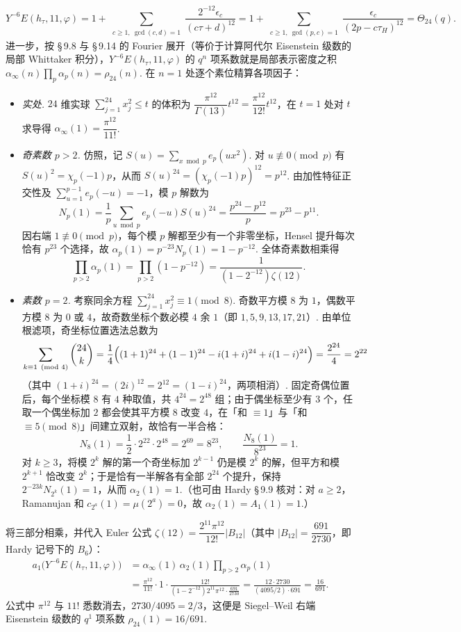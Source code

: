 \[
Y^{-6}E(h_\tau,11,\varphi)
=1+\sum_{\substack{c\ge 1,\ \gcd(c,d)=1}}\frac{2^{-12}\epsilon_c}{(c\tau+d)^{12}}
=1+\sum_{\substack{c\ge 1,\ \gcd(p,c)=1}}\frac{\epsilon_c}{(2p-c\tau_H)^{12}}
=\Theta_{24}(q).
\]
进一步，按 \S\,9.8 与 \S\,9.14 的 Fourier 展开（等价于计算阿代尔 Eisenstein 级数的局部 Whittaker 积分），$Y^{-6}E(h_\tau,11,\varphi)$ 的 $q^n$ 项系数就是局部表示密度之积 $\alpha_\infty(n)\prod_p\alpha_p(n)=\rho_{24}(n)$. 在 $n=1$ 处逐个素位精算各项因子：
\begin{itemize}
\item \emph{实处.} $24$ 维实球 $\sum_{j=1}^{24}x_j^2\le t$ 的体积为 $\dfrac{\pi^{12}}{\Gamma(13)}t^{12}=\dfrac{\pi^{12}}{12!}t^{12}$，在 $t=1$ 处对 $t$ 求导得 $\alpha_\infty(1)=\dfrac{\pi^{12}}{11!}$.
\item \emph{奇素数 $p>2$.} 仿照，记 $S(u)=\sum_{x\bmod p}e_p(ux^2)$. 对 $u\not\equiv 0\pmod p$ 有 $S(u)^2=\chi_p(-1)p$，从而 $S(u)^{24}=(\chi_p(-1)p)^{12}=p^{12}$. 由加性特征正交性及 $\sum_{u=1}^{p-1}e_p(-u)=-1$，模 $p$ 解数为
\[
N_p(1)=\frac{1}{p}\sum_{u\bmod p}e_p(-u)S(u)^{24}=\frac{p^{24}-p^{12}}{p}=p^{23}-p^{11}.
\]
因右端 $1\not\equiv 0\pmod p$，每个模 $p$ 解都至少有一个非零坐标，Hensel 提升每次恰有 $p^{23}$ 个选择，故 $\alpha_p(1)=p^{-23}N_p(1)=1-p^{-12}$. 全体奇素数相乘得
\[
\prod_{p>2}\alpha_p(1)=\prod_{p>2}(1-p^{-12})=\frac{1}{(1-2^{-12})\zeta(12)}.
\]
\item \emph{素数 $p=2$.} 考察同余方程 $\sum_{j=1}^{24}x_j^2\equiv 1\pmod 8$. 奇数平方模 $8$ 为 $1$，偶数平方模 $8$ 为 $0$ 或 $4$，故奇数坐标个数必模 $4$ 余 $1$（即 $1,5,9,13,17,21$）. 由单位根滤项，奇坐标位置选法总数为
\[
\sum_{k\equiv 1\pmod 4}\binom{24}{k}=\frac{1}{4}\Bigl((1+1)^{24}+(1-1)^{24}-i(1+i)^{24}+i(1-i)^{24}\Bigr)=\frac{2^{24}}{4}=2^{22}
\]
（其中 $(1+i)^{24}=(2i)^{12}=2^{12}=(1-i)^{24}$，两项相消）. 固定奇偶位置后，每个坐标模 $8$ 有 $4$ 种取值，共 $4^{24}=2^{48}$ 组；由于偶坐标至少有 $3$ 个，任取一个偶坐标加 $2$ 都会使其平方模 $8$ 改变 $4$，在「和 $\equiv 1$」与「和 $\equiv 5\pmod 8$」间建立双射，故恰有一半合格：
\[
N_8(1)=\frac{1}{2}\cdot 2^{22}\cdot 2^{48}=2^{69}=8^{23},\qquad \frac{N_8(1)}{8^{23}}=1.
\]
对 $k\ge 3$，将模 $2^k$ 解的第一个奇坐标加 $2^{k-1}$ 仍是模 $2^k$ 的解，但平方和模 $2^{k+1}$ 恰改变 $2^k$；于是恰有一半解各有全部 $2^{24}$ 个提升，保持 $2^{-23k}N_{2^k}(1)=1$，从而 $\alpha_2(1)=1$.（也可由 Hardy \S\,9.9 核对：对 $a\ge 2$，Ramanujan 和 $c_{2^a}(1)=\mu(2^a)=0$，故 $\alpha_2(1)=A_1(1)=1$.）
\end{itemize}
将三部分相乘，并代入 Euler 公式 $\zeta(12)=\dfrac{2^{11}\pi^{12}}{12!}|B_{12}|$（其中 $|B_{12}|=\dfrac{691}{2730}$，即 Hardy 记号下的 $B_6$）：
\[
\begin{aligned}
a_1\bigl(Y^{-6}E(h_\tau,11,\varphi)\bigr)
&=\alpha_\infty(1)\,\alpha_2(1)\prod_{p>2}\alpha_p(1)\\
&=\frac{\pi^{12}}{11!}\cdot 1\cdot\frac{12!}{(1-2^{-12})2^{11}\pi^{12}\cdot\frac{691}{2730}}
=\frac{12\cdot 2730}{(4095/2)\cdot 691}
=\frac{16}{691}.
\end{aligned}
\]
公式中 $\pi^{12}$ 与 $11!$ 悉数消去，$2730/4095=2/3$，这便是 Siegel--Weil 右端 Eisenstein 级数的 $q^1$ 项系数 $\rho_{24}(1)=16/691$.

